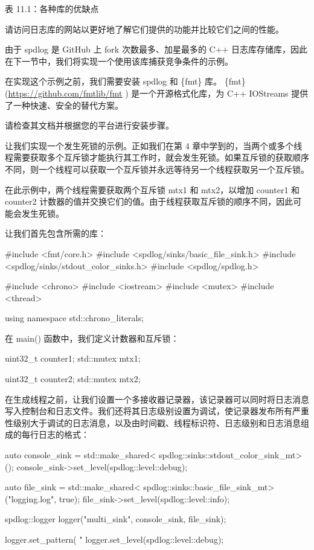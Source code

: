 \begin{center}
表 11.1：各种库的优缺点
\end{center}

请访问日志库的网站以更好地了解它们提供的功能并比较它们之间的性能。

由于 spdlog 是 GitHub 上 fork 次数最多、加星最多的 C++ 日志库存储库，因此在下一节中，我们将实现一个使用该库捕获竞争条件的示例。


在实现这个示例之前，我们需要安装 spdlog 和 \{fmt\} 库。 \{fmt\} (\url{https://github.com/fmtlib/fmt} ) 是一个开源格式化库，为 C++ IOStreams 提供了一种快速、安全的替代方案。

请检查其文档并根据您的平台进行安装步骤。

让我们实现一个发生死锁的示例。正如我们在第 4 章中学到的，当两个或多个线程需要获取多个互斥锁才能执行其工作时，就会发生死锁。如果互斥锁的获取顺序不同，则一个线程可以获取一个互斥锁并永远等待另一个线程获取另一个互斥锁。

在此示例中，两个线程需要获取两个互斥锁 mtx1 和 mtx2，以增加 counter1 和 counter2 计数器的值并交换它们的值。由于线程获取互斥锁的顺序不同，因此可能会发生死锁。

让我们首先包含所需的库：

\begin{cpp}
#include <fmt/core.h>
#include <spdlog/sinks/basic_file_sink.h>
#include <spdlog/sinks/stdout_color_sinks.h>
#include <spdlog/spdlog.h>

#include <chrono>
#include <iostream>
#include <mutex>
#include <thread>

using namespace std::chrono_literals;
\end{cpp}

在 main() 函数中，我们定义计数器和互斥锁：

\begin{cpp}
uint32_t counter1{};
std::mutex mtx1;

uint32_t counter2{};
std::mutex mtx2;
\end{cpp}

在生成线程之前，让我们设置一个多接收器记录器，该记录器可以同时将日志消息写入控制台和日志文件。我们还将其日志级别设置为调试，使记录器发布所有严重性级别大于调试的日志消息，以及由时间戳、线程标识符、日志级别和日志消息组成的每行日志的格式：

\begin{cpp}
auto console_sink = std::make_shared<
            spdlog::sinks::stdout_color_sink_mt>();
console_sink->set_level(spdlog::level::debug);

auto file_sink = std::make_shared<
            spdlog::sinks::basic_file_sink_mt>("logging.log",
                                                true);
file_sink->set_level(spdlog::level::info);

spdlog::logger logger("multi_sink",
        {console_sink, file_sink});

logger.set_pattern(
            "%
logger.set_level(spdlog::level::debug);
\end{cpp}

